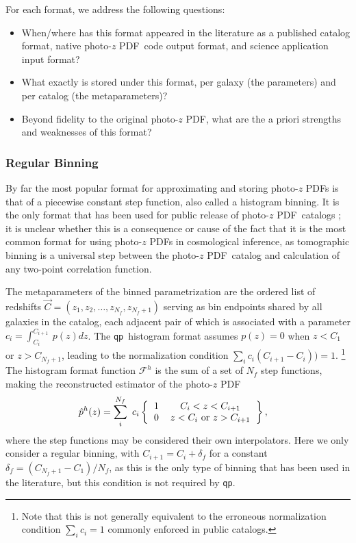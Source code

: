 \documentclass[\docopts]{\docclass}
\newcommand{\qp}{\texttt{qp}}
\newcommand{\pz}{photo-$z$ PDF}
\begin{document}
For each format, we address the following questions:
\begin{itemize}
  \item When/where has this format appeared in the literature as a published 
catalog format, native \pz\ code output format, and science application input 
format?
  \item What exactly is stored under this format, per galaxy (the parameters) 
and per catalog (the metaparameters)?
  \item Beyond fidelity to the original \pz, what are the a priori strengths 
and weaknesses of this format?
\end{itemize}

\subsubsection{Regular Binning}
\label{sec:bins}

By far the most popular format for approximating and storing \pz s is that of a 
piecewise constant step function, also called a histogram binning.  
\citep{carrasco_kind_somz:_2014, sadeh_annz2:_2016, cavuoti_metaphor:_2017}
It is the only format that has been used for public release of \pz\ catalogs 
\citep{tanaka_photometric_2017, sheldon_photometric_2012}; it is unclear 
whether this is a consequence or cause of the fact that it is the most common 
format for using \pz s in cosmological inference, as tomographic binning is a 
universal step between the \pz\ catalog and calculation of any two-point 
correlation function.

The metaparameters of the binned parametrization are the ordered list of 
redshifts $\vec{C} = (z_{1}, z_{2}, \dots, z_{N_{f}}, z_{N_{f}+1})$ serving as 
bin endpoints shared by all galaxies in the catalog, each adjacent pair of 
which is associated with a parameter $c_{i}=\int_{C_{i}}^{C_{i+1}}\ p(z)dz$.
The \qp\ histogram format assumes $p(z)=0$ when $z<C_{1}$ or $z>C_{N_{f}+1}$, 
leading to the normalization condition $\sum_{i} c_{i}(C_{i+1}-C_{i})) = 1$.
\footnote{Note that this is not generally equivalent to the erroneous 
normalization condition $\sum_{i} c_{i} = 1$ commonly enforced in public 
catalogs.}
The histogram format function $\mathcal{F}^{h}$ is the sum of a set of $N_{f}$ 
step functions, making the reconstructed estimator of the \pz
\begin{align}
  \label{eq:binned}
  \hat{p}^{h}(z) &= \sum_{i}^{N_{f}}\ c_{i} 
\left\{\begin{tabular}{cc}$1$&$C_{i}<z<C_{i+1}$\\
0&$z < C_{i}$\ or\ $z > C_{i+1}$\end{tabular}\right\},
\end{align}
where the step functions may be considered their own interpolators.
Here we only consider a regular binning, with $C_{i+1}=C_{i}+\delta_{f}$ for a 
constant $\delta_{f}=(C_{N_{f}+1}-C_{1})/N_{f}$, as this is the only type of 
binning that has been used in the literature, but this condition is not 
required by \qp.
\end{document}
